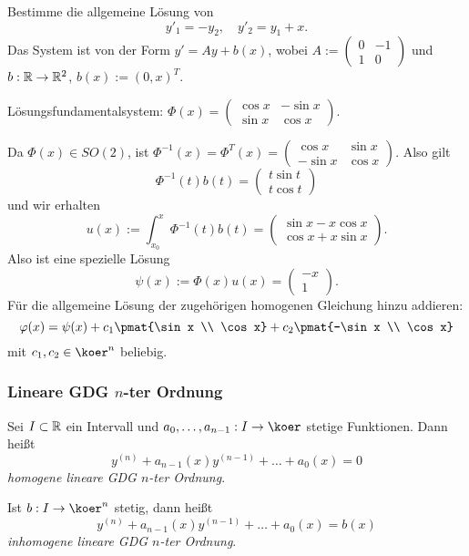 \begin{exmp}
  Bestimme die allgemeine Lösung von
  \[ y'_1 = -y_2, \quad y'_2 = y_1 + x. \]
  Das System ist von der Form $y' = Ay + b(x)$, wobei $A := \begin{pmatrix} 0 &
    -1 \\ 1 & 0 \end{pmatrix}$ und $b:\mathbb{R} \to \mathbb{R}^2$, $b(x) := (0,x)^T$.
  
  Lösungsfundamentalsystem: $\Phi(x) = \begin{pmatrix} \cos x & - \sin x \\ \sin
    x & \cos x \end{pmatrix}$.

  Da $\Phi(x) \in SO(2)$, ist $\Phi^{-1}(x) = \Phi^T(x) = \begin{pmatrix} \cos x
    & \sin x \\ - \sin x & \cos x \end{pmatrix}$. Also gilt
  \[ \Phi^{-1}(t) b(t) =  \begin{pmatrix} t \sin t \\ t \cos t \end{pmatrix} \]
  und wir erhalten
  \[ u(x) := \int_{x_0}^x \Phi^{-1}(t) b(t) = \begin{pmatrix} \sin x - x \cos x
      \\ \cos x + x \sin x \end{pmatrix}. \]
  Also ist eine spezielle Lösung 
  \[ \psi(x) := \Phi(x) u(x) = \begin{pmatrix} -x \\ 1 \end{pmatrix}. \]
  Für die allgemeine Lösung der zugehörigen homogenen Gleichung hinzu addieren:
  \[ \varphi(x) = \psi(x) + c_1 \pmat{\sin x \\ \cos x} + c_2 \pmat{-\sin x \\
        \cos x} \]
    mit $c_1, c_2 \in \koer^n$ beliebig.
\end{exmp}

\subsubsection{Lineare GDG \texorpdfstring{$n$}{n}-ter Ordnung}
Sei $I \subset \mathbb{R}$ ein Intervall und $a_0, \ldots, a_{n-1}: I \to \koer$
stetige Funktionen. Dann heißt
\[ y^{(n)} + a_{n-1}(x) y^{(n-1)} + \ldots + a_0(x) = 0 \tag{H} \]
\emph{homogene lineare GDG $n$-ter Ordnung}.

Ist $b:I \to \koer^n$ stetig, dann heißt
\[ y^{(n)} + a_{n-1}(x) y^{(n-1)} + \ldots + a_0(x) = b(x) \tag{I} \]
\emph{inhomogene lineare GDG $n$-ter Ordnung}.

